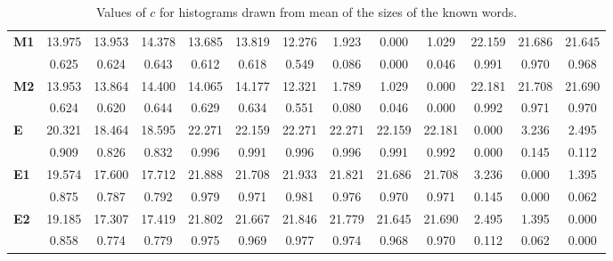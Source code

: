 \begin{table*}[h!]
\begin{center}
\begin{tabular}{| l || c | c | c || c | c | c || c | c | c || c | c | c |}
{\bf M1} & 13.975 & 13.953 & 14.378 & 13.685 & 13.819 & 12.276 & 1.923 & 0.000 & 1.029 & 22.159 & 21.686 & 21.645 \\
 & 0.625  & 0.624  & 0.643  & 0.612  & 0.618  & 0.549  & 0.086  & 0.000  & 0.046  & 0.991  & 0.970  & 0.968 \\\hline
{\bf M2} & 13.953 & 13.864 & 14.400 & 14.065 & 14.177 & 12.321 & 1.789 & 1.029 & 0.000 & 22.181 & 21.708 & 21.690 \\
 & 0.624  & 0.620  & 0.644  & 0.629  & 0.634  & 0.551  & 0.080  & 0.046  & 0.000  & 0.992  & 0.971  & 0.970 \\\hline\hline
{\bf E} & 20.321 & 18.464 & 18.595 & 22.271 & 22.159 & 22.271 & 22.271 & 22.159 & 22.181 & 0.000 & 3.236 & 2.495 \\
 & 0.909  & 0.826  & 0.832  & 0.996  & 0.991  & 0.996  & 0.996  & 0.991  & 0.992  & 0.000  & 0.145  & 0.112 \\\hline
{\bf E1} & 19.574 & 17.600 & 17.712 & 21.888 & 21.708 & 21.933 & 21.821 & 21.686 & 21.708 & 3.236 & 0.000 & 1.395 \\
 & 0.875  & 0.787  & 0.792  & 0.979  & 0.971  & 0.981  & 0.976  & 0.970  & 0.971  & 0.145  & 0.000  & 0.062 \\\hline
{\bf E2} & 19.185 & 17.307 & 17.419 & 21.802 & 21.667 & 21.846 & 21.779 & 21.645 & 21.690 & 2.495 & 1.395 & 0.000 \\
 & 0.858  & 0.774  & 0.779  & 0.975  & 0.969  & 0.977  & 0.974  & 0.968  & 0.970  & 0.112  & 0.062  & 0.000 \\\hline
\end{tabular}
\caption{Values of $c$ for histograms drawn from mean of the sizes of the known words.}
\end{center}
\end{table*}